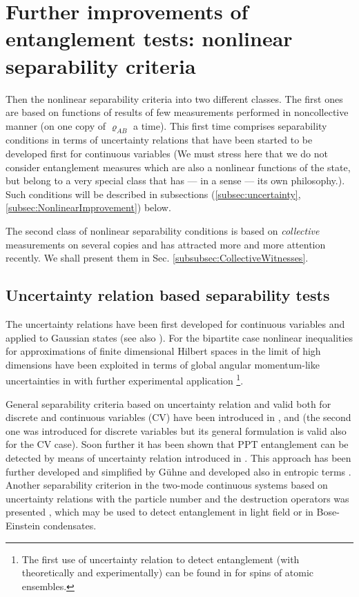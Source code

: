 \documentclass[rmp,12pt,preprint]{revtex4-2}
\begin{document}
\section{Further improvements of entanglement tests: nonlinear separability criteria}

Then the nonlinear separability criteria into two different classes.
The first ones are based on functions of results of few measurements
performed in noncollective manner (on one copy of $\varrho_{AB}$ a
time). This first time comprises separability conditions in terms of
uncertainty relations that have been started to be developed first for
continuous variables (We must stress here that we do not consider
entanglement measures which are also a nonlinear functions of the
state, but belong to a very special class that has --- in a sense ---
its own philosophy.). Such conditions will be described in subsections
(\ref{subsec:uncertainty}, \ref{subsec:NonlinearImprovement}) below.

The second class of nonlinear separability conditions is based on
{\it collective} measurements on several copies and has attracted
more and more attention recently. We shall present them in
Sec. \ref{subsubsec:CollectiveWitnesses}.



\subsection{Uncertainty relation based separability tests
\label{subsec:uncertainty}}

The uncertainty relations have been first developed for continuous
variables and applied to Gaussian states \cite{DuanGCZ1999-criterion}
(see also \cite{ManciniGVT2001-criterion}). For the bipartite case
nonlinear inequalities for approximations of finite dimensional
Hilbert spaces in the limit of high dimensions have been exploited in
terms of global angular momentum-like uncertainties in \cite{Polzik0}
with further experimental application \cite{PolzikJK}\footnote {The first use of uncertainty relation to detect
entanglement (with theoretically and experimentally) can be found in \cite {HaldSSP1999} for spins of atomic ensembles.}.

General separability criteria based on uncertainty relation and valid
both for discrete and continuous variables (CV) have been introduced
in \cite{Giovannetti1}, and \cite{HofmannT} (the second one was
introduced for discrete variables but its general formulation is valid
also for the CV case). Soon further it has been shown \cite{Hoffman2}
that PPT entanglement can be detected by means of uncertainty relation
introduced in \cite{HofmannT}. This approach has been further
developed and simplified by G{\"u}hne \cite{OGuehne} and developed
also in entropic terms \cite{GuehneL2004-pra}. Another separability criterion in the two-mode continuous systems
based on uncertainty relations with the particle number and the destruction operators
was presented \cite{TothSC2003}, which may be used to detect entanglement  in light  field
 or in Bose-Einstein condensates.
\end{document}
